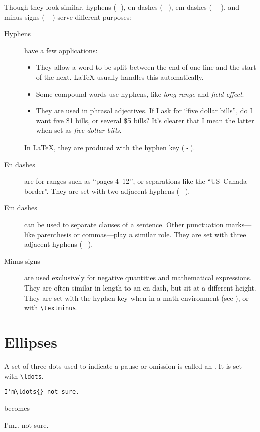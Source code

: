 Though they look similar,
hyphens (\,-\,), en dashes (\,--\,),
em dashes (\,---\,), and minus signs (\,$-$\,)
serve different purposes:
\begin{description}
\item[Hyphens] have a few applications:
    \begin{itemize}[leftmargin=*]
    \item They allow a word to be split between the end of one line and the
        start of the next.
        \LaTeX{} usually handles this automatically.
    \item Some compound words use hyphens, like \emph{long-range}
        and \emph{field-effect}.
    \item They are used in phrasal adjectives.
        If I ask for ``five dollar bills''\punckern,
        do I want five \$1 bills, or several \$5 bills?
        It's clearer that I mean the latter when set as
        \emph{five-dollar bills}.
    \end{itemize}
    In \LaTeX{}, they are produced with the hyphen key (\,\texttt{-}\,).

\item[En dashes] are for ranges such as ``pages 4--12''\quotekern,
    or separations like the \mbox{``US--Canada} border''\quotekern.
    They are set with two adjacent hyphens (\,\texttt{--}\,).

\item[Em dashes] can be used to separate clauses of a sentence.
    Other punctuation marks---like parenthesis or commas---play a similar
    role.
    They are set with three adjacent hyphens (\,\texttt{---}\,).

\item[Minus signs] are used exclusively for negative quantities and
    mathematical expressions.
    They are often similar in length to an en dash,
    but sit at a different height.
    They are set with the hyphen key when in a math environment
    (see ), or with \verb|\textminus|.
\end{description}

\section{Ellipses}

A set of three dots used to indicate a pause or omission is called an
.
It is set with \verb|\ldots|.
\begin{leftfigure}
\begin{lstlisting}
I'm\ldots{} not sure.
\end{lstlisting}
\end{leftfigure}
becomes
\begin{leftfigure}
\lm%
I'm\ldots{} not sure.
\end{leftfigure}

